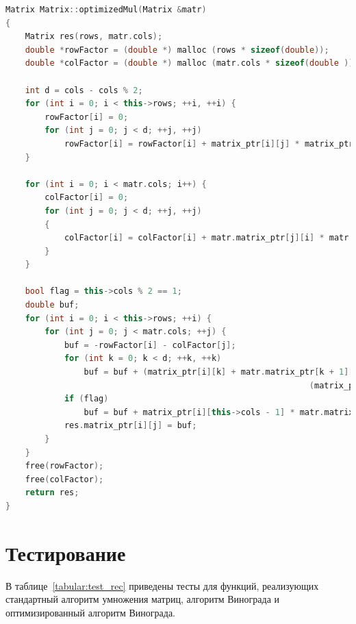 \documentclass[12pt]{report}
\begin{document}
\begin{lstlisting}[label=vin_opt_code,caption=Функция оптимизированного алгоритма умножения матриц Винограда,language=C++]
Matrix Matrix::optimizedMul(Matrix &matr)
{
    Matrix res(rows, matr.cols);
    double *rowFactor = (double *) malloc (rows * sizeof(double));
    double *colFactor = (double *) malloc (matr.cols * sizeof(double ));

    int d = cols - cols % 2;
    for (int i = 0; i < this->rows; ++i, ++i) {
        rowFactor[i] = 0;
        for (int j = 0; j < d; ++j, ++j)
            rowFactor[i] = rowFactor[i] + matrix_ptr[i][j] * matrix_ptr[i][j + 1];
    }

    for (int i = 0; i < matr.cols; i++) {
        colFactor[i] = 0;
        for (int j = 0; j < d; ++j, ++j)
        {
            colFactor[i] = colFactor[i] + matr.matrix_ptr[j][i] * matr.matrix_ptr[j + 1][i];
        }
    }

    bool flag = this->cols % 2 == 1;
    double buf;
    for (int i = 0; i < this->rows; ++i) {
        for (int j = 0; j < matr.cols; ++j) {
            buf = -rowFactor[i] - colFactor[j];
            for (int k = 0; k < d; ++k, ++k)
                buf = buf + (matrix_ptr[i][k] + matr.matrix_ptr[k + 1][j]) *
                                                              (matrix_ptr[i][k + 1] + matr.matrix_ptr[k][j]);
            if (flag)
                buf = buf + matrix_ptr[i][this->cols - 1] * matr.matrix_ptr[this->cols - 1][j];
            res.matrix_ptr[i][j] = buf;
        }
    }
    free(rowFactor);
    free(colFactor);
    return res;
}
\end{lstlisting}

\newpage
\section{Тестирование}

В таблице~\ref{tabular:test_rec} приведены тесты для функций, реализующих стандартный алгоритм умножения матриц, алгоритм Винограда и оптимизированный алгоритм Винограда.
\end{document}

